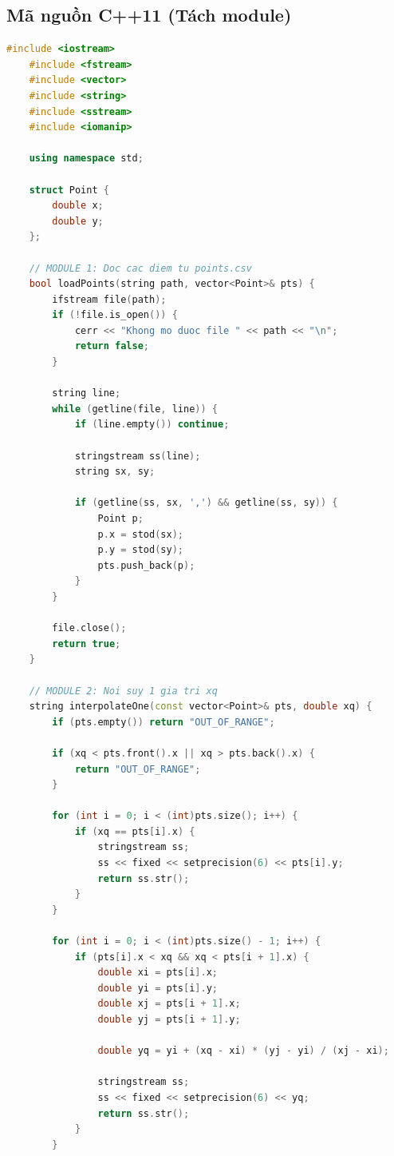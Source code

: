 \subsection{Mã nguồn C++11 (Tách module)}
\begin{lstlisting}[language=C++, breaklines=true]
    #include <iostream>
    #include <fstream>
    #include <vector>
    #include <string>
    #include <sstream>
    #include <iomanip>

    using namespace std;

    struct Point {
        double x;
        double y;
    };

    // MODULE 1: Doc cac diem tu points.csv
    bool loadPoints(string path, vector<Point>& pts) {
        ifstream file(path);
        if (!file.is_open()) {
            cerr << "Khong mo duoc file " << path << "\n";
            return false;
        }

        string line;
        while (getline(file, line)) {
            if (line.empty()) continue;

            stringstream ss(line);
            string sx, sy;

            if (getline(ss, sx, ',') && getline(ss, sy)) {
                Point p;
                p.x = stod(sx);
                p.y = stod(sy);
                pts.push_back(p);
            }
        }

        file.close();
        return true;
    }

    // MODULE 2: Noi suy 1 gia tri xq
    string interpolateOne(const vector<Point>& pts, double xq) {
        if (pts.empty()) return "OUT_OF_RANGE";

        if (xq < pts.front().x || xq > pts.back().x) {
            return "OUT_OF_RANGE";
        }

        for (int i = 0; i < (int)pts.size(); i++) {
            if (xq == pts[i].x) {
                stringstream ss;
                ss << fixed << setprecision(6) << pts[i].y;
                return ss.str();
            }
        }

        for (int i = 0; i < (int)pts.size() - 1; i++) {
            if (pts[i].x < xq && xq < pts[i + 1].x) {
                double xi = pts[i].x;
                double yi = pts[i].y;
                double xj = pts[i + 1].x;
                double yj = pts[i + 1].y;

                double yq = yi + (xq - xi) * (yj - yi) / (xj - xi);

                stringstream ss;
                ss << fixed << setprecision(6) << yq;
                return ss.str();
            }
        }


\end{lstlisting}
